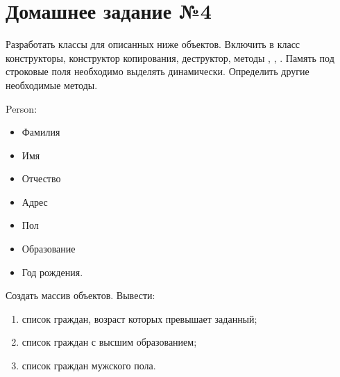 \section*{Домашнее задание №4}

Разработать классы для описанных ниже объектов. Включить в класс
конструкторы, конструктор копирования, деструктор, методы ,
, . Память под строковые поля необходимо выделять
динамически. Определить другие необходимые методы.

Person:
\begin{itemize}
	\item Фамилия
	\item Имя
	\item Отчество
	\item Адрес
	\item Пол
	\item Образование
	\item Год рождения.
\end{itemize}

Создать массив объектов. Вывести:
\begin{enumerate}
	\item список граждан, возраст которых превышает заданный;
	\item список граждан с высшим образованием;
	\item список граждан мужского пола.
\end{enumerate}
